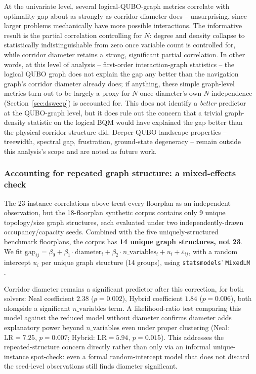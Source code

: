 \documentclass[11pt]{article}
\begin{document}
At the univariate level, several logical-QUBO-graph metrics correlate with optimality gap about as strongly as corridor diameter does -- unsurprising, since larger problems mechanically have more possible interactions. The informative result is the partial correlation controlling for $N$: degree and density collapse to statistically indistinguishable from zero once variable count is controlled for, while corridor diameter retains a strong, significant partial correlation. In other words, at this level of analysis -- first-order interaction-graph statistics -- the logical QUBO graph does not explain the gap any better than the navigation graph's corridor diameter already does; if anything, these simple graph-level metrics turn out to be largely a proxy for $N$ once diameter's own $N$-independence (Section~\ref{sec:dsweep}) is accounted for. This does not identify a \emph{better} predictor at the QUBO-graph level, but it does rule out the concern that a trivial graph-density statistic on the logical BQM would have explained the gap better than the physical corridor structure did. Deeper QUBO-landscape properties -- treewidth, spectral gap, frustration, ground-state degeneracy -- remain outside this analysis's scope and are noted as future work.

\subsubsection{Accounting for repeated graph structure: a mixed-effects check}
\label{sec:mixedeffects}

The 23-instance correlations above treat every floorplan as an independent observation, but the 18-floorplan synthetic corpus contains only 9 unique topology/size graph structures, each evaluated under two independently-drawn occupancy/capacity seeds. Combined with the five uniquely-structured benchmark floorplans, the corpus has \textbf{14 unique graph structures, not 23}. We fit $\text{gap}_{ij} = \beta_0 + \beta_1 \cdot \text{diameter}_i + \beta_2 \cdot n\_\text{variables}_i + u_i + \varepsilon_{ij}$, with a random intercept $u_i$ per unique graph structure (14 groups), using \texttt{statsmodels}' \texttt{MixedLM} \cite{statsmodels}.

Corridor diameter remains a significant predictor after this correction, for both solvers: Neal coefficient $2.38$ ($p=0.002$), Hybrid coefficient $1.84$ ($p=0.006$), both alongside a significant $n\_\text{variables}$ term. A likelihood-ratio test comparing this model against the reduced model without diameter confirms diameter adds explanatory power beyond $n\_\text{variables}$ even under proper clustering (Neal: $\text{LR}=7.25$, $p=0.007$; Hybrid: $\text{LR}=5.94$, $p=0.015$). This addresses the repeated-structure concern directly rather than only via an informal unique-instance spot-check: even a formal random-intercept model that does not discard the seed-level observations still finds diameter significant.
\end{document}
